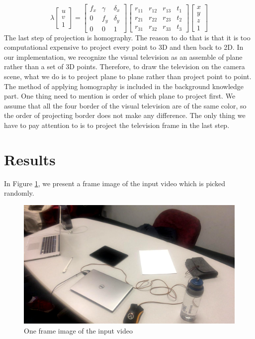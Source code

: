 \documentclass[paper=a4, fontsize=14pt]{scrartcl}
\numberwithin{equation}{section}		%
\numberwithin{figure}{section}			%
\numberwithin{table}{section}				%
\begin{document}
$$\lambda\begin{bmatrix}u \\ v \\ 1\end{bmatrix} = 
\begin{bmatrix}
f_x & \gamma & \delta_x\\
0 & f_y & \delta_y\\
0 & 0 & 1\end{bmatrix}
\begin{bmatrix}r_{11} & r_{12} & r_{13} & t_{1}\\
r_{21} & r_{22} & r_{23} & t_{2}\\
r_{31} & r_{32} & r_{33} & t_{3}\end{bmatrix}
\begin{bmatrix}
x \\ y \\ z \\ 1
\end{bmatrix}$$
\indent The last step of projection is homography. The reason to do that is that it is too computational expensive to project every point to 3D and then back to 2D. In our implementation, we recognize the visual television as an assemble of plane rather than a set of 3D points. Therefore, to draw the television on the camera scene, what we do is to project plane to plane rather than project point to point. The method of applying homography is included in the background knowledge part. One thing need to mention is order of which plane to project first. We assume that all the four border of the visual television are of the same color, so the order of projecting border does not make any difference. The only thing we have to pay attention to is to project the television frame in the last step.

\newpage
\section{Results}

In Figure \ref{fig:original}, we present a frame image of the input video which is picked randomly.
\begin{figure}[h]
	\centering
	\includegraphics[width=.80\linewidth]{images/original.png}
	\caption{One frame image of the input video}
	\label{fig:original}
\end{figure}
\end{document}
